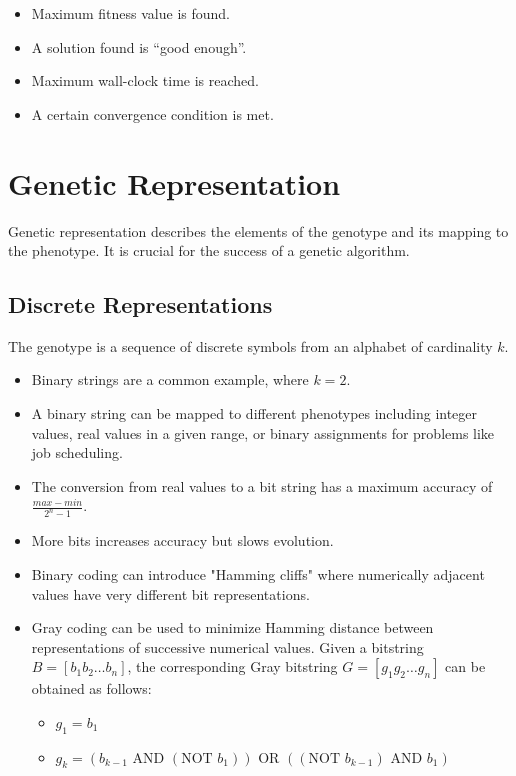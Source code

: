 \begin{itemize}
    \item  Maximum fitness value is found.
    \item  A solution found is “good enough”.
    \item  Maximum wall-clock time is reached.
    \item A certain convergence condition is met.
\end{itemize}

\section{Genetic Representation}
Genetic representation describes the elements of the genotype and its mapping to the phenotype. It is crucial for the success of a genetic algorithm.

\subsection*{Discrete Representations}
The genotype is a sequence of discrete symbols from an alphabet of cardinality \(k\).
\begin{itemize}
    \item  Binary strings are a common example, where \(k = 2\).
    \item  A binary string can be mapped to different phenotypes including integer values, real values in a given range, or binary assignments for problems like job scheduling.
    \item The conversion from real values to a bit string has a maximum accuracy of \(\frac{max - min}{2^n - 1}\).
    \item More bits increases accuracy but slows evolution.
    \item Binary coding can introduce "Hamming cliffs" where numerically adjacent values have very different bit representations.
    \item  Gray coding can be used to minimize Hamming distance between representations of successive numerical values. Given a bitstring \(B = [b_1 b_2 \dots b_n]\), the corresponding Gray bitstring \(G = [g_1 g_2 \dots g_n]\) can be obtained as follows:
        \begin{itemize}
            \item \(g_1 = b_1\)
            \item \(g_k = (b_{k-1} \text{ AND } (\text{NOT } b_1)) \text{ OR } ((\text{NOT } b_{k-1}) \text{ AND } b_1)\)
        \end{itemize}
\end{itemize}

